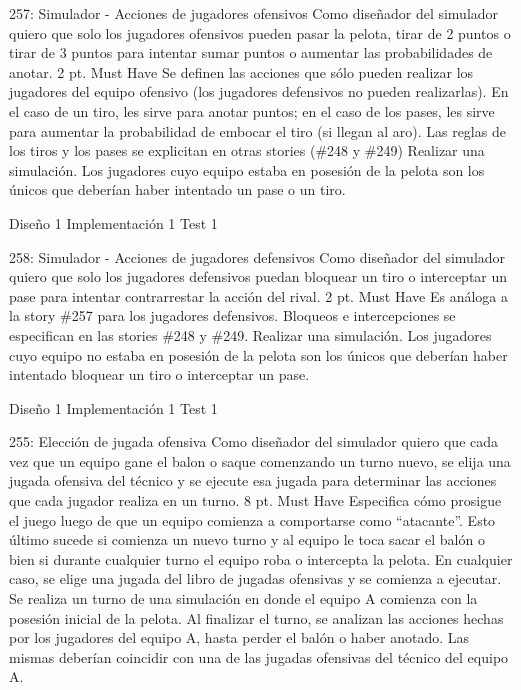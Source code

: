 \sprintstory
{257: Simulador - Acciones de jugadores ofensivos}
{Como diseñador del simulador quiero que solo los jugadores ofensivos pueden pasar la pelota, tirar de 2 puntos o tirar de 3 puntos para intentar sumar puntos o aumentar las probabilidades de anotar.}
{2 pt.}
{Must Have}
{Se definen las acciones que sólo pueden realizar los jugadores del equipo ofensivo (los jugadores defensivos no pueden realizarlas). En el caso
de un tiro, les sirve para anotar puntos; en el caso de los pases, les sirve para aumentar la probabilidad de embocar el tiro (si llegan al aro).
Las reglas de los tiros y los pases se explicitan en otras stories (\#248 y \#249)}
{Realizar una simulación. Los jugadores cuyo equipo estaba en posesión de la pelota son los únicos que deberían haber intentado un pase o un tiro.}

\begin{taskstable}
 \task
 {Diseño}
 {1}
 \task
 {Implementación}
 {1}
 \task
 {Test}
 {1}
\end{taskstable}

\vspace{1cm}
	

\sprintstory
{258: Simulador - Acciones de jugadores defensivos}
{Como diseñador del simulador quiero que solo los jugadores defensivos puedan bloquear un tiro o interceptar un pase para intentar contrarrestar la acción del rival.}
{2 pt.}
{Must Have}
{Es análoga a la story \#257 para los jugadores defensivos. Bloqueos e intercepciones se especifican en las stories \#248 y \#249.}
{Realizar una simulación. Los jugadores cuyo equipo no estaba en posesión de la pelota son los únicos que deberían haber intentado bloquear un tiro o interceptar un pase.}

\begin{taskstable}
 \task
 {Diseño}
 {1}
 \task
 {Implementación}
 {1}
 \task
 {Test}
 {1}
\end{taskstable}

\vspace{1cm}


\sprintstory
{255: Elección de jugada ofensiva}
{Como diseñador del simulador quiero que cada vez que un equipo gane el balon o saque comenzando un turno nuevo, se elija una jugada ofensiva del técnico y se ejecute esa jugada para determinar las acciones que cada jugador realiza en un turno.}
{8 pt.}
{Must Have}
{Especifica cómo prosigue el juego luego de que un equipo comienza a comportarse como ``atacante''. Esto último sucede si comienza un nuevo turno
y al equipo le toca sacar el balón o bien si durante cualquier turno el equipo roba o intercepta la pelota. En cualquier caso, se elige una jugada
del libro de jugadas ofensivas y se comienza a ejecutar.}
{Se realiza un turno de una simulación en donde el equipo A comienza con la posesión inicial de la pelota. Al finalizar el turno, se analizan las acciones
hechas por los jugadores del equipo A, hasta perder el balón o haber anotado. Las mismas deberían coincidir con una de las jugadas ofensivas del técnico del equipo A. }

